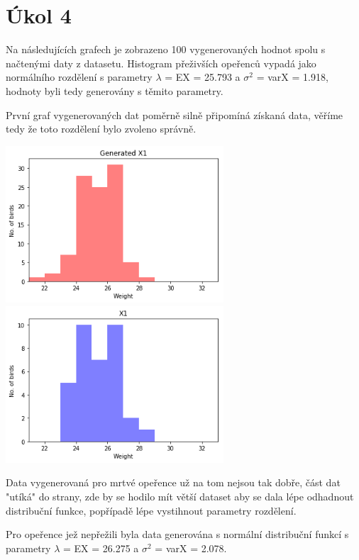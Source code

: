 \documentclass[12pt,a4paper]{article}
\begin{document}
\section{Úkol 4}
Na následujících grafech je zobrazeno 100 vygenerovaných hodnot spolu s načtenými daty z datasetu. Histogram přeživších opeřenců vypadá jako normálního rozdělení s parametry $\lambda$ = EX = 25.793 a $\sigma ^2$ = varX = 1.918, hodnoty byli tedy generovány s těmito parametry. 

První graf vygenerovaných dat poměrně silně připomíná získaná data, věříme tedy že toto rozdělení bylo zvoleno správně.

\includegraphics[width=3.2in]{4_Survived_Gen}
\includegraphics[width=3.2in]{4_Survived_Data}

Data vygenerovaná pro mrtvé opeřence už na tom nejsou tak dobře, část dat "utíká" do strany, zde by se hodilo mít větší dataset aby se dala lépe odhadnout distribuční funkce, popřípadě lépe vystihnout parametry rozdělení.

Pro opeřence jež nepřežili byla data generována s normální distribuční funkcí s parametry $\lambda$ = EX = 26.275 a $\sigma ^2$ = varX = 2.078.
\end{document}
